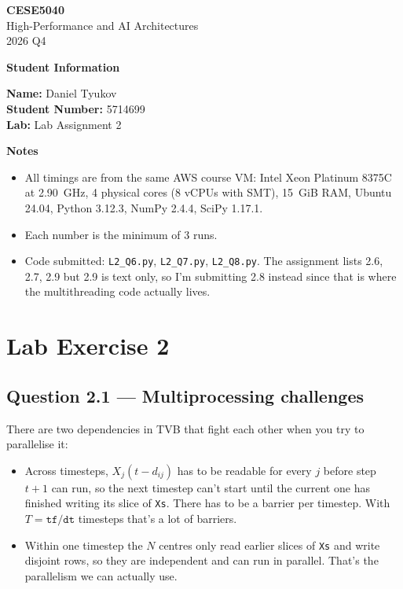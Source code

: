 \documentclass[11pt,a4paper]{article}
\newcommand{\courseheader}{
    \begin{center}
        {\sffamily\Large\bfseries CESE5040}\\[0.3em]
        {\sffamily High-Performance and AI Architectures}\\
        {\color{lightgray}2026 Q4}
    \end{center}
}
\newcommand{\Q}[1]{\subsection*{Question #1}}
\begin{document}
\courseheader

\vspace{1em}

{\color{headingcolor}\sffamily\large\bfseries Student Information}

\textbf{Name:} Daniel Tyukov\\
\textbf{Student Number:} 5714699\\
\textbf{Lab:} Lab Assignment 2

{\color{headingcolor}\sffamily\large\bfseries Notes}

\begin{itemize}
    \item All timings are from the same AWS course VM:
    Intel Xeon Platinum 8375C at 2.90~GHz, 4 physical cores
    (8 vCPUs with SMT), 15~GiB RAM, Ubuntu 24.04, Python 3.12.3,
    NumPy 2.4.4, SciPy 1.17.1.
    \item Each number is the minimum of 3 runs.
    \item Code submitted: \texttt{L2\_Q6.py}, \texttt{L2\_Q7.py},
    \texttt{L2\_Q8.py}. The assignment lists 2.6, 2.7, 2.9 but 2.9 is
    text only, so I'm submitting 2.8 instead since that is where the
    multithreading code actually lives.
\end{itemize}

\vspace{0.8em}

\section*{\color{headingcolor}Lab Exercise 2}

\Q{2.1 — Multiprocessing challenges}

There are two dependencies in TVB that fight each other when you try
to parallelise it:

\begin{itemize}
    \item Across timesteps, $X_j(t - d_{ij})$ has to be readable for
    every $j$ before step $t+1$ can run, so the next timestep can't
    start until the current one has finished writing its slice of
    \texttt{Xs}. There has to be a barrier per timestep. With
    $T = \texttt{tf}/\texttt{dt}$ timesteps that's a lot of barriers.
    \item Within one timestep the $N$ centres only read earlier slices
    of \texttt{Xs} and write disjoint rows, so they are independent and
    can run in parallel. That's the parallelism we can actually use.
\end{itemize}
\end{document}
